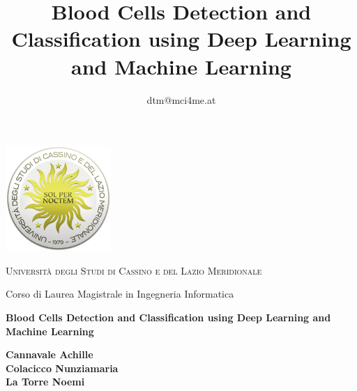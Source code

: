\documentclass[minted, draw]{../tex/hebdomon}
\begin{document}
\title{Blood Cells Detection and Classification using Deep Learning and Machine Learning}

\date{dtm@mci4me.at}



\begin{titlepage}
    \centering
	\includegraphics[width=4cm]{figures/logo.png}\par\vspace{1cm}


    {\scshape\LARGE Università degli Studi di Cassino e del Lazio Meridionale\par}
    \vspace{1cm}
    {\Large Corso di Laurea Magistrale in Ingegneria Informatica \par}

    \vspace{2cm}
    {\Huge\bfseries Blood Cells Detection and Classification using Deep Learning and Machine Learning\par}
    \vspace{1cm}

    \vfill

    \begin{flushleft}
    \textbf{Cannavale Achille} \\
    \textbf{Colacicco Nunziamaria} \\
    \textbf{La Torre Noemi} \\
    \end{flushleft}

    \vspace{1.5cm}


\end{titlepage}

\dominitoc
\tableofcontents
\newpage

\Chapter{}
\end{document}
